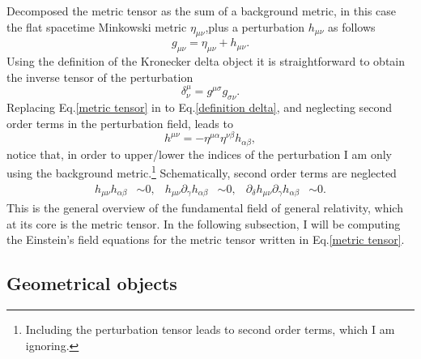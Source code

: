 \documentclass{article}
\begin{document}
Decomposed the metric tensor as the sum of a background metric, in this case 
the flat spacetime Minkowski metric $\eta_{\mu\nu}$,plus a perturbation 
$h_{\mu\nu}$ as follows
\begin{equation}
    \label{metric tensor}
    g_{\mu\nu} =  \eta_{\mu\nu} + h_{\mu\nu}.
\end{equation}
Using the definition of the Kronecker delta object it is straightforward to
obtain the inverse tensor of the perturbation
\begin{equation}
    \label{definition delta}
    \delta^{\mu}_{\nu} = g^{\mu\sigma}g_{\sigma\nu}.
\end{equation}
Replacing Eq.\eqref{metric tensor} in to Eq.\eqref{definition delta}, and
neglecting second order terms in the perturbation field, leads to
\begin{equation}
    h^{\mu\nu} = -\eta^{\mu\alpha}\eta^{\nu\beta}h_{\alpha\beta},
\end{equation}
notice that, in order to upper/lower the indices of the perturbation I am only
using the background metric.\footnote{Including the perturbation tensor leads
to second order terms, which I am ignoring.} Schematically, second order terms
are neglected 
\begin{align}
    h_{\mu\nu}h_{\alpha\beta} & \sim 0, & 
    h_{\mu\nu}\partial_{\gamma} h_{\alpha\beta} & \sim 0, &
    \partial_{\delta} h_{\mu\nu}\partial_\gamma h_{\alpha\beta} & \sim 0.
\end{align}
This is the general overview of the fundamental field of general relativity,
which at its core is the metric tensor. In the following subsection, I will
be computing the Einstein's field equations for the metric tensor written 
in Eq.\eqref{metric tensor}.

\subsection{Geometrical objects}
\end{document}
